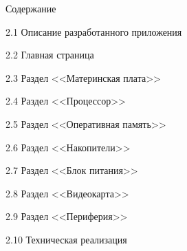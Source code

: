 \documentclass[a4paper,14pt]{extarticle}
\begin{document}
\begin{center}
{\large Содержание}
\end{center}

\vspace{0.5cm}

 

 

 

 

\noindent\hspace{1.5em}2.1 \quad Описание разработанного приложения 

\noindent\hspace{1.5em}2.2 \quad Главная страница 

\noindent\hspace{1.5em}2.3 \quad Раздел <<Материнская плата>> 

\noindent\hspace{1.5em}2.4 \quad Раздел <<Процессор>> 

\noindent\hspace{1.5em}2.5 \quad Раздел <<Оперативная память>> 

\noindent\hspace{1.5em}2.6 \quad Раздел <<Накопители>> 

\noindent\hspace{1.5em}2.7 \quad Раздел <<Блок питания>> 

\noindent\hspace{1.5em}2.8 \quad Раздел <<Видеокарта>> 

\noindent\hspace{1.5em}2.9 \quad Раздел <<Периферия>> 

\noindent\hspace{1.5em}2.10 \quad Техническая реализация 

 

 
\end{document}
